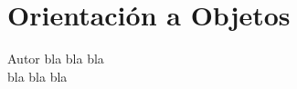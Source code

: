 \documentclass{book}
\begin{document}
	
	
	\section*{Orientación a Objetos}
	
	\begin{thebibliography}{9}
		Autor bla bla bla
		\\
		bla bla bla
	\end{thebibliography}
\end{document}
